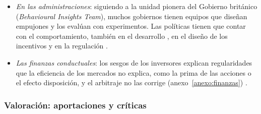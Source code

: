 \documentclass[11pt]{article}
\begin{document}
\begin{itemize}
\begin{itemize}
  \end{itemize}
\item \emph{En las administraciones}: siguiendo a la unidad pionera del Gobierno británico (\emph{Behavioural Insights Team}), muchos gobiernos tienen equipos que diseñan empujones y los evalúan con experimentos. Las políticas tienen que contar con el comportamiento, también en el desarrollo , en el diseño de los incentivos  y en la regulación .
\item \emph{Las finanzas conductuales}: los sesgos de los inversores explican regularidades que la eficiencia de los mercados no explica, como la prima de las acciones o el efecto disposición, y el arbitraje no las corrige\nocite{ShleiferVishny1997Limits} (anexo~\ref{anexo:finanzas})  .
\end{itemize}

\subsubsection{Valoración: aportaciones y críticas}\label{sec:valoracion-conductual}
\end{document}
